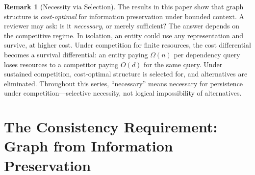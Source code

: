 \documentclass[11pt]{article}
\theoremstyle{definition}
\newtheorem*{remark}{Remark}
\begin{document}
\begin{remark}[Necessity via Selection]
\label{rem:necessity}
The results in this paper show that graph structure is
\emph{cost-optimal} for information preservation under bounded context.
A reviewer may ask: is it \emph{necessary}, or merely sufficient? The
answer depends on the competitive regime. In isolation, an entity could
use any representation and survive, at higher cost. Under competition
for finite resources, the cost differential becomes a survival
differential: an entity paying $\Omega(n)$ per dependency query loses
resources to a competitor paying $O(d)$ for the same query. Under
sustained competition, cost-optimal structure is selected for, and
alternatives are eliminated. Throughout this series, ``necessary'' means
necessary for persistence under competition---selective necessity, not
logical impossibility of alternatives.
\end{remark}

\section{The Consistency Requirement: Graph from Information Preservation}
\label{sec:info}
\end{document}
